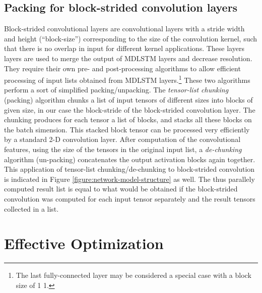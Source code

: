 \documentclass[conference]{IEEEtran}
\renewcommand{\ac}[1]{\gls{#1}}
\begin{document}
\subsection{Packing for block-strided convolution layers}
\label{subsection:packing-for-block-strided-convolution}
Block-strided convolutional layers are convolutional layers with a stride  width and height (``block-size'') corresponding to the 
size of the convolution kernel, such that there is no overlap in input for different  kernel applications. 
These layers layers are used to merge the output of \ac{MDLSTM} layers and decrease resolution. They
require their own pre- and post-processing algorithms to allow efficient processing of input lists obtained from 
\ac{MDLSTM} layers.\footnote{The last fully-connected layer may be considered a special case with a block size of 
1  1.} These two algorithms perform a sort of simplified packing/unpacking.
The \emph{tensor-list chunking} (packing) algorithm chunks a list of input tensors of different sizes into blocks of given size, in our case 
the block-stride of the block-strided convolution layer. The chunking produces for each tensor a list of blocks, and stacks all these blocks 
on the batch simension. This stacked block tensor can be processed very efficiently by a standard 2-D convolution layer.
After computation of the convolutional features, using the size of the tensors in the original input list, a \emph{de-chunking}
algorithm (un-packing) concatenates the output activation blocks again together. 
This application of tensor-list chunking/de-chunking to block-strided convolution is indicated in Figure \ref{figure:network-model-structure} as well. The thus parallely computed result list is equal to what would be 
obtained if the block-strided convolution was computed for each input tensor separately and the result tensors collected in a list.


\section{Effective Optimization} 
\end{document}
